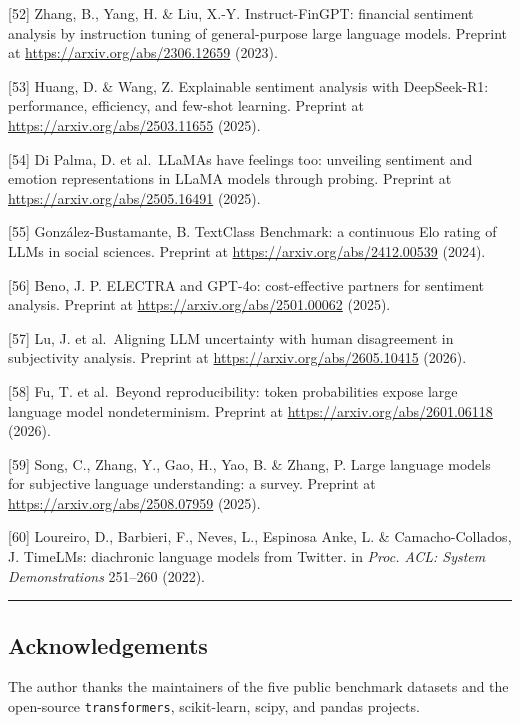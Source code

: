 \documentclass[11pt]{article}
\begin{document}
{[}52{]} Zhang, B., Yang, H. \& Liu, X.-Y. Instruct-FinGPT: financial
sentiment analysis by instruction tuning of general-purpose large
language models. Preprint at \url{https://arxiv.org/abs/2306.12659} (2023).

{[}53{]} Huang, D. \& Wang, Z. Explainable sentiment analysis with
DeepSeek-R1: performance, efficiency, and few-shot learning. Preprint at
\url{https://arxiv.org/abs/2503.11655} (2025).

{[}54{]} Di Palma, D. et al.~LLaMAs have feelings too: unveiling
sentiment and emotion representations in LLaMA models through probing.
Preprint at \url{https://arxiv.org/abs/2505.16491} (2025).

{[}55{]} González-Bustamante, B. TextClass Benchmark: a continuous Elo
rating of LLMs in social sciences. Preprint at
\url{https://arxiv.org/abs/2412.00539} (2024).

{[}56{]} Beno, J. P. ELECTRA and GPT-4o: cost-effective partners for
sentiment analysis. Preprint at \url{https://arxiv.org/abs/2501.00062} (2025).

{[}57{]} Lu, J. et al.~Aligning LLM uncertainty with human disagreement
in subjectivity analysis. Preprint at \url{https://arxiv.org/abs/2605.10415}
(2026).

{[}58{]} Fu, T. et al.~Beyond reproducibility: token probabilities
expose large language model nondeterminism. Preprint at
\url{https://arxiv.org/abs/2601.06118} (2026).

{[}59{]} Song, C., Zhang, Y., Gao, H., Yao, B. \& Zhang, P. Large
language models for subjective language understanding: a survey.
Preprint at \url{https://arxiv.org/abs/2508.07959} (2025).

{[}60{]} Loureiro, D., Barbieri, F., Neves, L., Espinosa Anke, L. \&
Camacho-Collados, J. TimeLMs: diachronic language models from Twitter.
in \emph{Proc. ACL: System Demonstrations} 251--260 (2022).

\begin{center}\rule{0.5\linewidth}{0.5pt}\end{center}

\subsection{Acknowledgements}\label{acknowledgements}

The author thanks the maintainers of the five public benchmark datasets
and the open-source \texttt{transformers}, scikit-learn, scipy, and
pandas projects.
\end{document}
